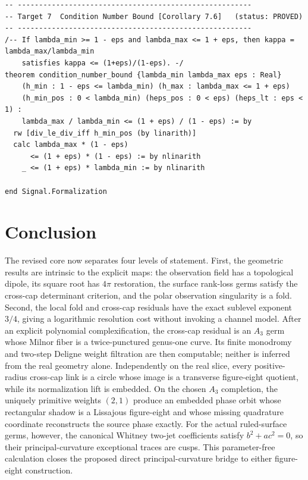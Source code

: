 \documentclass[11pt]{article}
\begin{document}
\begin{lstlisting}[language=lean4,
  caption={Lean 4 formalization targets; \texttt{sorry} and placeholders mark unfinished obligations.}]
-- -------------------------------------------------------
-- Target 7  Condition Number Bound [Corollary 7.6]   (status: PROVED)
-- -------------------------------------------------------
/-- If lambda_min >= 1 - eps and lambda_max <= 1 + eps, then kappa = lambda_max/lambda_min
    satisfies kappa <= (1+eps)/(1-eps). -/
theorem condition_number_bound {lambda_min lambda_max eps : Real}
    (h_min : 1 - eps <= lambda_min) (h_max : lambda_max <= 1 + eps)
    (h_min_pos : 0 < lambda_min) (heps_pos : 0 < eps) (heps_lt : eps < 1) :
    lambda_max / lambda_min <= (1 + eps) / (1 - eps) := by
  rw [div_le_div_iff h_min_pos (by linarith)]
  calc lambda_max * (1 - eps)
      <= (1 + eps) * (1 - eps) := by nlinarith
    _ <= (1 + eps) * lambda_min := by nlinarith

end Signal.Formalization
\end{lstlisting}

\section{Conclusion}

The revised core now separates four levels of statement.  First, the geometric
results are intrinsic to the explicit maps: the observation field has a
topological dipole, its square root has $4\pi$ restoration, the surface
rank-loss germs satisfy the cross-cap determinant criterion, and the polar
observation singularity is a fold.  Second, the local fold and cross-cap
residuals have the exact sublevel exponent $3/4$, giving a logarithmic
resolution cost without invoking a channel model.  After an explicit
polynomial complexification, the cross-cap residual is an $A_3$ germ whose
Milnor fiber is a twice-punctured genus-one curve.  Its finite monodromy and
two-step Deligne weight filtration are then computable; neither is inferred
from the real geometry alone.  Independently on the real slice, every
positive-radius cross-cap link is a circle whose image is a transverse
figure-eight quotient, while its normalization lift is embedded.  On the
chosen $A_3$ completion, the uniquely primitive weights $(2,1)$ produce an
embedded phase orbit whose rectangular shadow is a Lissajous figure-eight and
whose missing quadrature coordinate reconstructs the source phase exactly.
For the actual ruled-surface germs, however, the canonical Whitney two-jet
coefficients satisfy $b^2+ac^2=0$, so their principal-curvature exceptional
traces are cusps.  This parameter-free calculation closes the proposed direct
principal-curvature bridge to either figure-eight construction.
\end{document}

